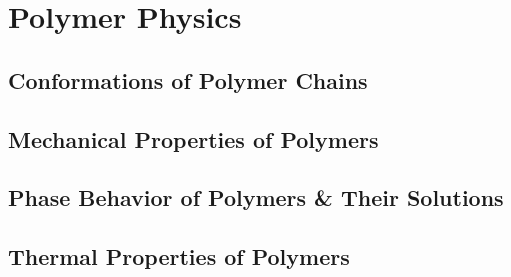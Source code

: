 \documentclass[book]{pogil}
\begin{document}
\part{Polymer Physics}

	\chapter{Conformations of Polymer Chains}

	\chapter{Mechanical Properties of Polymers}

	\chapter{Phase Behavior of Polymers \& Their Solutions}

	\chapter{Thermal Properties of Polymers}





\backmatter
\end{document}
